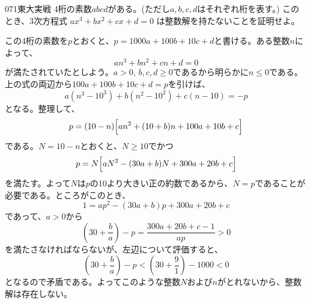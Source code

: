 \begin{prob}{071}{}{東大実戦}
 4桁の素数$abcd$がある。(ただし$a, b, c, d$はそれぞれ桁を表す。) このとき、3次方程式 $ax^3+bx^2+cx+d=0$ は整数解を持たないことを証明せよ。
\end{prob}

この4桁の素数を$p$とおくと、$p=1000a+100b+10c+d$と書ける。ある整数$n$によって、
\[ an^3+bn^2+cn+d=0 \]
が満たされていたとしよう。$a>0$, $b, c, d\ge 0$であるから明らかに$n\le 0$である。上の式の両辺から$100a+100b+10c+d=p$を引けば、
\[ a(n^3-10^3)+b(n^2-10^2)+c(n-10)=-p \]
となる。整理して、
\[ p=(10-n)\Bigl[an^2+(10+b)n+100a+10b+c\Bigr] \]
である。$N=10-n$とおくと、$N\ge 10$でかつ
\[ p=N\Bigl[aN^2-(30a+b)N+300a+20b+c\Bigr] \]
を満たす。よって$N$は$p$の10より大きい正の約数であるから、$N=p$であることが必要である。ところがこのとき、
\[ 1=ap^2-(30a+b)p+300a+20b+c \]
であって、$a>0$から
\[ \left(30+\frac{b}{a}\right)-p = \frac{300a+20b+c-1}{ap}>0 \]
を満たさなければならないが、左辺について評価すると、
\[ \left(30+\frac{b}{a}\right)-p < \left(30+\frac{9}{1}\right)-1000 < 0 \]
となるので矛盾である。よってこのような整数$N$および$n$がとれないから、整数解は存在しない。